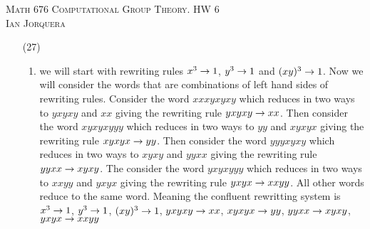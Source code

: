 \documentclass[12pt]{amsart}
\begin{document}
\begin{center}
   \textsc{Math 676 Computational Group Theory. HW 6\\ Ian Jorquera}
\end{center}
\vspace{1em}

\begin{itemize}
    \item[(27)] 
    \begin{enumerate}[label=(\alph*)]
        \item we will start with rewriting rules $x^3\rightarrow 1$, $y^3\rightarrow 1$ and 
        $(xy)^3\rightarrow 1$.
        Now we will consider the words that are combinations of left hand 
        sides of rewriting rules. Consider the word $xxxyxyxy$ which reduces 
        in two ways to $yxyxy$ and $xx$ giving the rewriting rule $yxyxy\rightarrow xx$.
        Then consider the word $xyxyxyyy$ which reduces 
        in two ways to $yy$ and $xyxyx$ giving the rewriting rule $xyxyx\rightarrow yy$.
        Then consider the word $yyyxyxy$ which reduces 
        in two ways to $xyxy$ and $yyxx$ giving the rewriting rule $yyxx\rightarrow xyxy$.
        The consider the word $yxyxyyy$ which reduces 
        in two ways to $xxyy$ and $yxyx$ giving the rewriting rule $yxyx\rightarrow xxyy$.
        All other words reduce to the same word. Meaning the confluent rewritting system is
        $x^3\rightarrow 1$, $y^3\rightarrow 1$, $(xy)^3\rightarrow 1$, $yxyxy\rightarrow xx$, $xyxyx\rightarrow yy$, $yyxx\rightarrow xyxy$, $yxyx\rightarrow xxyy$


\end{enumerate}
\end{itemize}
\end{document}
